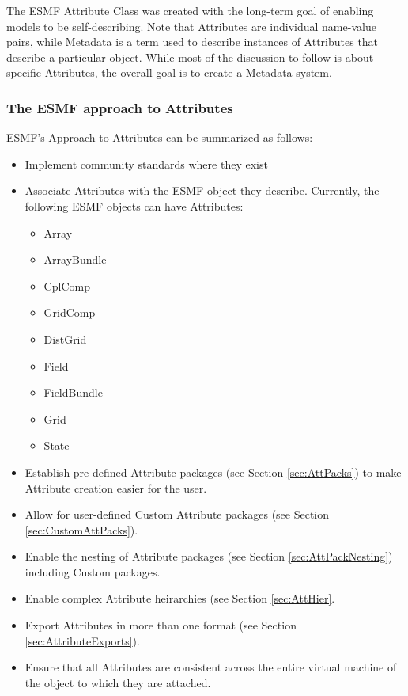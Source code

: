 %


The ESMF Attribute Class was created with the long-term goal of enabling models to be self-describing. Note that Attributes are individual name-value pairs, while Metadata is a term used to describe instances of Attributes that describe a particular object. While most of the discussion to follow is about specific Attributes, the overall goal is to create a Metadata system.   

\subsubsection{The ESMF approach to Attributes}

ESMF's Approach to Attributes can be summarized as follows:

\begin{itemize}
  \item Implement community standards where they exist
  \item Associate Attributes with the ESMF object they describe. Currently, the following ESMF objects can have Attributes:
  \begin{itemize}
     \item Array
     \item ArrayBundle
     \item CplComp
     \item GridComp
     \item DistGrid
     \item Field
     \item FieldBundle
     \item Grid
     \item State
     \end{itemize}
  \item Establish pre-defined Attribute packages (see Section \ref{sec:AttPacks}) to make Attribute creation easier for the user.
  \item Allow for user-defined Custom Attribute packages (see Section \ref{sec:CustomAttPacks}).
  \item Enable the nesting of Attribute packages (see Section \ref{sec:AttPackNesting}) including Custom packages.
  \item Enable complex Attribute heirarchies (see Section \ref{sec:AttHier}.
  \item Export Attributes in more than one format (see Section \ref{sec:AttributeExports}).
  \item Ensure that all Attributes are consistent across the entire virtual machine of the object to which they are attached.
\end{itemize}

